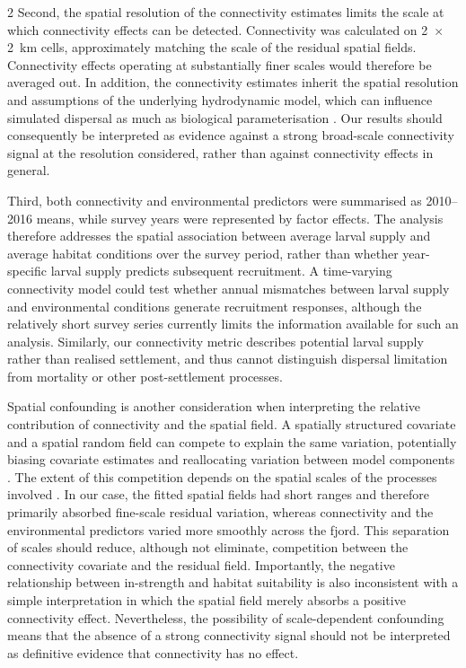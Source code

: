 \begin{spacing}{2}
Second, the spatial resolution of the connectivity estimates limits the scale at which connectivity effects can be detected. Connectivity was calculated on 2~$\times$2~km cells, approximately matching the scale of the residual spatial fields. Connectivity effects operating at substantially finer scales would therefore be averaged out. In addition, the connectivity estimates inherit the spatial resolution and assumptions of the underlying hydrodynamic model, which can influence simulated dispersal as much as biological parameterisation \citep{sciasciaLarvalDispersalSimulations2022,saint-amandBiophysicalModelsResolution2023}. Our results should consequently be interpreted as evidence against a strong broad-scale connectivity signal at the resolution considered, rather than against connectivity effects in general.

Third, both connectivity and environmental predictors were summarised as 2010–2016 means, while survey years were represented by factor effects. The analysis therefore addresses the spatial association between average larval supply and average habitat conditions over the survey period, rather than whether year-specific larval supply predicts subsequent recruitment. A time-varying connectivity model could test whether annual mismatches between larval supply and environmental conditions generate recruitment responses, although the relatively short survey series currently limits the information available for such an analysis. Similarly, our connectivity metric describes potential larval supply rather than realised settlement, and thus cannot distinguish dispersal limitation from mortality or other post-settlement processes.

Spatial confounding is another consideration when interpreting the relative contribution of connectivity and the spatial field. A spatially structured covariate and a spatial random field can compete to explain the same variation, potentially biasing covariate estimates and reallocating variation between model components \citep{huiSpatialConfoundingJoint2024,makinenSpatialConfoundingBayesian2022}. The extent of this competition depends on the spatial scales of the processes involved \citep{paciorekImportanceScaleSpatialConfounding2010}. In our case, the fitted spatial fields had short ranges and therefore primarily absorbed fine-scale residual variation, whereas connectivity and the environmental predictors varied more smoothly across the fjord. This separation of scales should reduce, although not eliminate, competition between the connectivity covariate and the residual field. Importantly, the negative relationship between in-strength and habitat suitability is also inconsistent with a simple interpretation in which the spatial field merely absorbs a positive connectivity effect. Nevertheless, the possibility of scale-dependent confounding means that the absence of a strong connectivity signal should not be interpreted as definitive evidence that connectivity has no effect.


\end{spacing}
